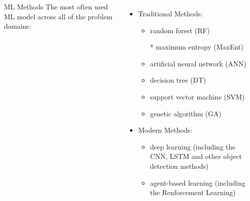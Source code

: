 \begin{frame}
\begin{columns}[t]
        \begin{block}{ML Methods}
            The most often used ML model across all of the problem domains:
        \end{block}
        \begin{itemize}
            \item Traditional Methods:
                \begin{itemize}
                    \item random forest (RF)
                    \item[*] maximum entropy (MaxEnt)\footnotemark[1]
                    \item artificial neural network (ANN)
                    \item decision tree (DT)
                    \item support vector machine (SVM)
                    \item genetic algorithm (GA)
                \end{itemize}
            \item Modern Methods:
                \begin{itemize}
                    \item deep learning (including the CNN, LSTM and other object
                        detection methods)
                    \item agent-based learning (including the Renforcement
                        Learning)
                \end{itemize}
        \end{itemize}
    \end{columns}
\end{frame}

